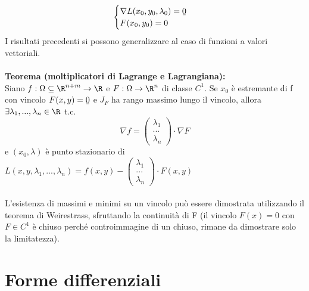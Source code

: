 \documentclass{article}
\begin{document}
\begin{equation*}
    \begin{cases}
    \nabla L(x_0,y_0,\lambda_0) =\ubar{0}\\
    F(x_0,y_0)=0
    \end{cases}
\end{equation*}
I risultati precedenti si possono generalizzare al caso di funzioni a valori vettoriali.\\\\
\textbf{Teorema (moltiplicatori di Lagrange e Lagrangiana):}\\
Siano $f:\Omega\subseteq\R^{n+m}\rightarrow\R$ e $F:\Omega\rightarrow\R^n$ di classe $C^1$. Se $x_0$ è estremante di f con vincolo $F(x,y)=\ubar{0}$ e $J_F$ ha rango massimo lungo il vincolo, allora $\exists\lambda_1,...,\lambda_n\in\R$ t.c.
$$ \nabla f= \begin{pmatrix} \lambda_1\\...\\\lambda_n\end{pmatrix}\cdot\nabla F$$
e $(x_0,\lambda)$ è punto stazionario di $L(x,y,\lambda_1,...,\lambda_n)=f(x,y)-\begin{pmatrix} \lambda_1\\...\\\lambda_n\end{pmatrix}\cdot F(x,y)$\\\\
L'esistenza di massimi e minimi su un vincolo può essere dimostrata utilizzando il teorema di Weirestrass, sfruttando la continuità di F (il vincolo $F(x)=0$ con $F\in C^1$ è chiuso perché controimmagine di un chiuso, rimane da dimostrare solo la limitatezza).

\newpage
\section{Forme differenziali}
\end{document}
